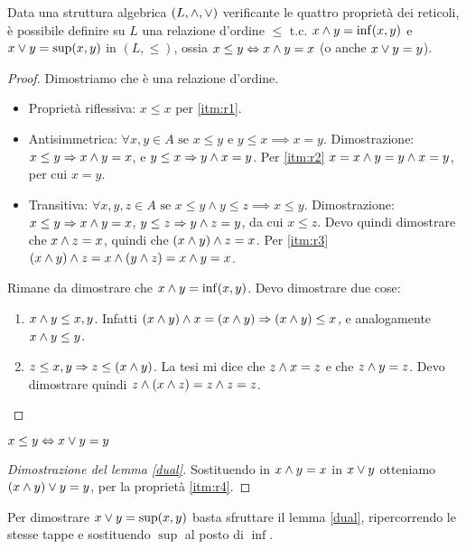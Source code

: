 \begin{theorem}
Data una struttura algebrica $(L, \wedge, \vee)$ verificante le quattro propriet\`a dei reticoli, \`e possibile definire su $L$ una relazione d'ordine $\le$ t.c. $ x \wedge y = \inf(x,y) $ e $ x \vee y = \sup(x,y) $ in $ (L, \le)$, ossia $x \le y \Leftrightarrow x \wedge y = x $ (o anche $ x \vee y = y$).
\end{theorem}
\begin{proof}
Dimostriamo che \`e una relazione d'ordine.
\begin{itemize}
    \item Propriet\`a riflessiva: $x \le x$ per \ref{itm:r1}.
    \item Antisimmetrica: $\forall x, y \in A \text{ se } x \leq y \text{ e }  y \leq x \implies x = y$. Dimostrazione: $x \le y \Rightarrow x \wedge y = x$, e $y \le x \Rightarrow y \wedge x = y$. Per \ref{itm:r2} $x = x \wedge y = y \wedge x = y$, per cui $x = y$.
    \item Transitiva: $\forall x, y, z \in A \text{ se } x \leq y \land y \leq z \implies x \leq y$. Dimostrazione: $x \le y \Rightarrow x \wedge y = x$, $y \le z \Rightarrow y \wedge z = y$, da cui $x \le z$. Devo quindi dimostrare che $x \wedge z = x$, quindi che $(x \wedge y) \wedge z = x$. Per \ref{itm:r3} $(x \wedge y) \wedge z = x \wedge (y \wedge z) = x \wedge y = x$. 
\end{itemize}
Rimane da dimostrare che $x \wedge y = \inf(x,y)$. Devo dimostrare due cose:
\begin{enumerate}
    \item $x \wedge y \le x, y$. Infatti $(x \wedge y) \wedge x = (x \wedge y) \Rightarrow (x \wedge y) \le x$, e analogamente $x \wedge y \le y$.
    \item $z \le x, y \Rightarrow z \le (x \wedge y)$. La tesi mi dice che $z \wedge x = z$ e che $z \wedge y = z$. Devo dimostrare quindi $z \wedge (x \wedge z) = z \wedge z = z$.
\end{enumerate}
\end{proof}

\begin{lem}\label{dual}
$ x \le y \Leftrightarrow x \vee y = y $
\end{lem}
\begin{proof}[Dimostrazione del lemma \ref{dual}]
Sostituendo in $x \wedge y = x$ in $ x \vee y $ otteniamo $ (x \wedge y) \vee y = y $, per la propriet\`a \ref{itm:r4}.
\end{proof}
Per dimostrare $x \vee y = \sup(x,y)$ basta sfruttare il lemma \ref{dual}, ripercorrendo le stesse tappe e sostituendo $\sup$ al posto di $\inf$.

